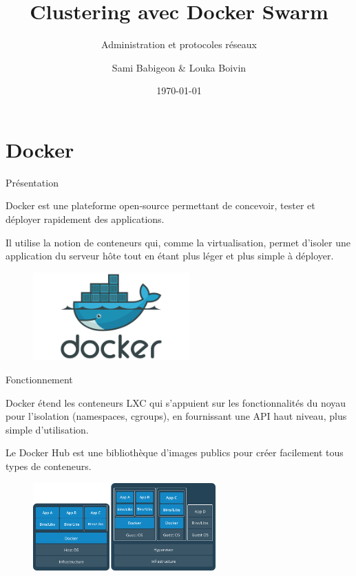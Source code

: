 \documentclass{cubeamer}
\title{Clustering avec Docker Swarm}
\subtitle{Administration et protocoles réseaux}
\author[Sami Babigeon \& Louka Boivin]{Sami Babigeon \& Louka Boivin}
\date{\today}
\institute[Université de Rouen]{Master 2 SSI}
\begin{document}

\maketitle
\cutoc

\section{Docker}

\begin{frame}{Présentation}
    \begin{multicols}{2}
    Docker est une plateforme open-source permettant de concevoir, tester et déployer rapidement
    des applications.
    
    Il utilise la notion de conteneurs qui, comme la virtualisation,
    permet d'isoler une application du serveur hôte tout en étant plus léger et plus simple à
    déployer.

    \columnbreak
    \begin{figure}
        \centering
        \includegraphics[width=6cm]{img/docker}
    \end{figure}    

    \end{multicols}
\end{frame}

\begin{frame}{Fonctionnement}
    \begin{multicols}{2}
    Docker étend les conteneurs LXC qui s'appuient sur les fonctionnalités du noyau pour
    l'isolation (namespaces, cgroups), en fournissant une API haut niveau, plus simple
    d'utilisation.

    Le Docker Hub est une bibliothèque d'images publics pour créer facilement tous
    types de conteneurs.
    
    \columnbreak
    \begin{figure}
        \centering
        \includegraphics[width=7cm]{img/vm-container}
    \end{figure}    

    \end{multicols}
\end{frame}
\end{document}
